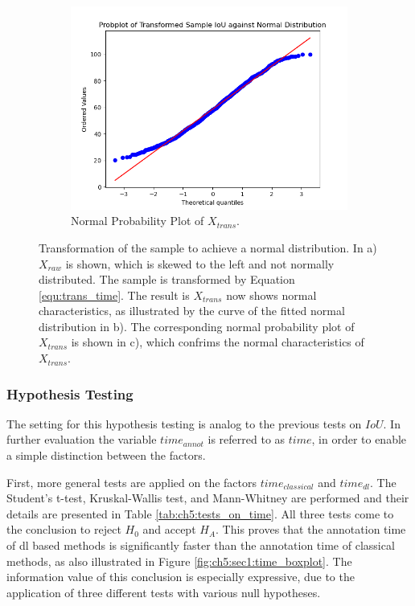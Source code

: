 \begin{figure} [h]
	\begin{subfigure}[t]{0.3\textwidth}
		\centering
		\includegraphics[width=\textwidth]{figures/chap51_time_probplot.png}
		\caption{
			Normal Probability Plot of $X_{trans}$.
		}\label{fig:ch5:sec1:time_probplot}
	\end{subfigure}
	\caption[Time Sample Transformation]{
		Transformation of the sample to achieve a normal distribution.
		In a) $X_{raw}$ is shown, which is skewed to the left and not normally distributed.
		The sample is transformed by Equation \ref{equ:trans_time}.
		The result is $X_{trans}$ now shows normal characteristics, as illustrated by the curve of the fitted normal distribution in b).
		The corresponding normal probability plot of $X_{trans}$ is shown in c), which confrims the normal characteristics of $X_{trans}$.
	}\label{fig:ch5:sec1:time_transformation_iou}
\end{figure}




\subsubsection{Hypothesis Testing}

The setting for this hypothesis testing is analog to the previous tests on $IoU$.
In further evaluation the variable $time_{annot}$ is referred to as $time$, in order to enable a simple distinction between the factors.

First, more general tests are applied on the factors $time_{classical}$ and $time_{dl}$.
The Student's t-test, Kruskal-Wallis test, and Mann-Whitney are performed and their details are presented in Table \ref{tab:ch5:tests_on_time}.
All three tests come to the conclusion to reject $H_{0}$ and accept $H_{A}$.
This proves that the annotation time of \gls{dl} based methods is significantly faster than the annotation time of classical methods, as also illustrated in Figure \ref{fig:ch5:sec1:time_boxplot}.
The information value of this conclusion is especially expressive, due to the application of three different tests with various null hypotheses.


